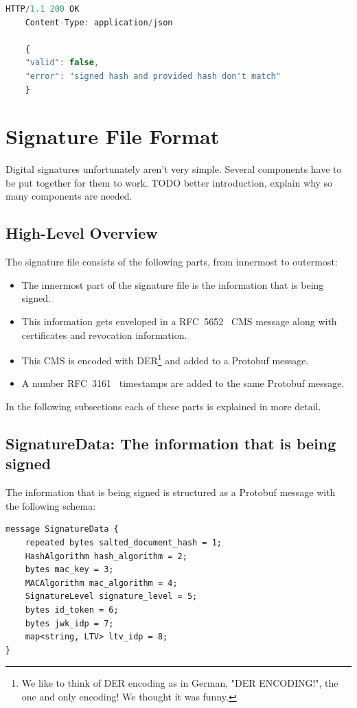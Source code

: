 \begin{lstlisting}[caption={sign response}, captionpos=b, language=JavaScript, label={lst:verifyresponsefailed}]
    HTTP/1.1 200 OK
    Content-Type: application/json

    {
    "valid": false,
    "error": "signed hash and provided hash don't match"
    }
\end{lstlisting}

\section{Signature File Format}\label{sec:signature-file-format}
Digital signatures unfortunately aren't very simple.
Several components have to be put together for them to work.
TODO better introduction, explain why so many components are needed.
\subsection{High-Level Overview}\label{subsec:high-level-overview}
The signature file consists of the following parts, from innermost to outermost:

\begin{itemize}
    \item The innermost part of the signature file is the information that is being signed.
    \item This information gets enveloped in a RFC~5652~\cite{rfc5652} \gls{CMS} message along with certificates and revocation information.
    \item This \gls{CMS} is encoded with \gls{DER}\footnote{We like to think of DER encoding as in German, "DER ENCODING!", the one and only encoding! We thought it was funny.} and added to a Protobuf message.
    \item A number RFC~3161~\cite{rfc3161} timestamps are added to the same Protobuf message.
\end{itemize}

In the following subsections each of these parts is explained in more detail.

\subsection{SignatureData: The information that is being signed}\label{subsec:signaturedata:-the-information-that-is-being-signed}
The information that is being signed is structured as a Protobuf message with the following schema:

\begin{lstlisting}[caption={SignatureData schema}, captionpos=b, label={lst:signaturedataschema}]
message SignatureData {
    repeated bytes salted_document_hash = 1;
    HashAlgorithm hash_algorithm = 2;
    bytes mac_key = 3;
    MACAlgorithm mac_algorithm = 4;
    SignatureLevel signature_level = 5;
    bytes id_token = 6;
    bytes jwk_idp = 7;
    map<string, LTV> ltv_idp = 8;
}
\end{lstlisting}


